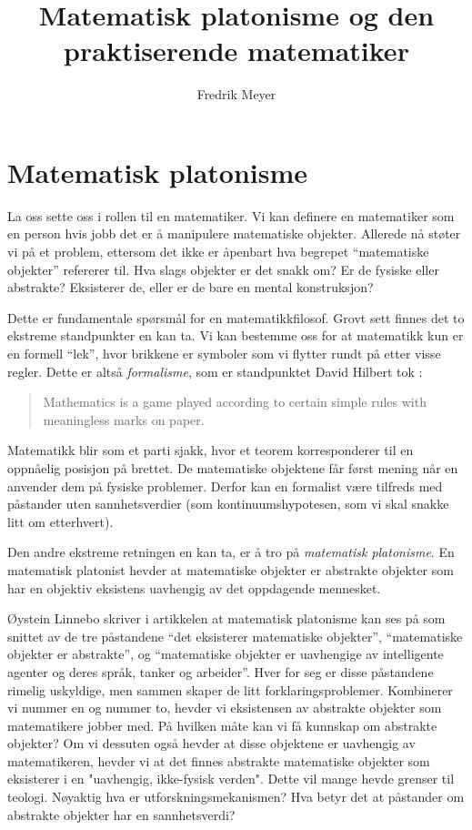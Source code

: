 \documentclass[12pt, norsk]{article}
\begin{document}
\title{Matematisk platonisme og den praktiserende matematiker}
\author{Fredrik Meyer}
\maketitle 


\section{Matematisk platonisme}

La oss sette oss i rollen til en matematiker. Vi kan definere en matematiker som en person hvis jobb det er å manipulere matematiske objekter. Allerede nå støter vi på et problem, ettersom det ikke er åpenbart hva  begrepet ``matematiske objekter'' refererer til. Hva slags objekter er det snakk om? Er de fysiske eller abstrakte? Eksisterer de, eller er de bare en mental konstruksjon?

Dette er fundamentale spørsmål for en matematikkfilosof. Grovt sett finnes det to ekstreme standpunkter en kan ta. Vi kan bestemme oss for at matematikk kun er en formell ``lek'', hvor brikkene er symboler som vi flytter rundt på etter visse regler. Dette er altså \emph{formalisme}, som er standpunktet David Hilbert tok \cite{hilbert_quote}:

\begin{quote}Mathematics is a game played according to certain simple rules with meaningless marks on paper.
\end{quote}

Matematikk blir som et parti sjakk, hvor et teorem korresponderer til en oppnåelig posisjon på brettet. De matematiske objektene får først mening når en anvender dem på fysiske problemer. Derfor kan en formalist være tilfreds med påstander uten sannhetsverdier (som kontinuumshypotesen, som vi skal snakke litt om etterhvert).

Den andre ekstreme retningen en kan ta, er å tro på \emph{matematisk platonisme}. En matematisk platonist hevder at matematiske objekter er abstrakte objekter som har en objektiv eksistens uavhengig av det oppdagende mennesket.

Øystein Linnebo skriver i artikkelen \cite{platonism} at matematisk platonisme kan ses på som snittet av de tre påstandene ``det eksisterer matematiske objekter'', ``matematiske objekter er abstrakte'', og ``matematiske objekter er uavhengige av intelligente agenter og deres språk, tanker og arbeider''. Hver for seg er disse påstandene rimelig uskyldige, men sammen skaper de litt forklaringsproblemer. Kombinerer vi nummer en og nummer to, hevder vi eksistensen av abstrakte objekter som matematikere jobber med. På hvilken måte kan vi få kunnskap om abstrakte objekter? Om vi dessuten også hevder at disse objektene er uavhengig av matematikeren, hevder vi at det finnes abstrakte matematiske objekter som eksisterer i en "uavhengig, ikke-fysisk verden". Dette vil mange hevde grenser til teologi. Nøyaktig hva er utforskningsmekanismen? Hva betyr det at påstander om abstrakte objekter har en sannhetsverdi? 
\end{document}
